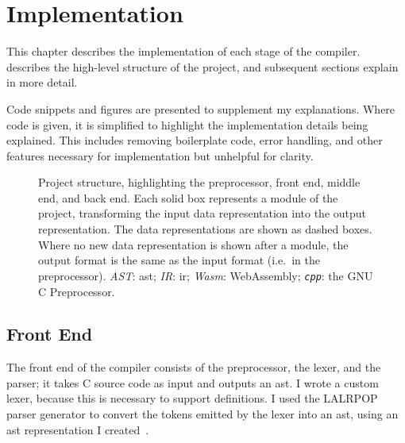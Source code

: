 \documentclass[00-main.tex]{subfiles}
\begin{document}
\chapter{Implementation}

This chapter describes the implementation of each stage of the compiler.
 describes the high-level structure of the project, and subsequent sections explain in more detail.

Code snippets and figures are presented to supplement my explanations.
Where code is given, it is simplified to highlight the implementation details being explained.
This includes removing boilerplate code, error handling, and other features necessary for implementation but unhelpful for clarity.

\begin{figure}[!t]
  \centering
  \caption{Project structure, highlighting the preprocessor, front end, middle end, and back end. Each solid box represents a module of the project, transforming the input data representation into the output representation. The data representations are shown as dashed boxes. Where no new data representation is shown after a module, the output format is the same as the input format (i.e.~in the preprocessor). \emph{AST}: \acrlong{ast}; \emph{IR}: \acrlong{ir}; \emph{Wasm}: WebAssembly; \textit{\texttt{cpp}}: the GNU C Preprocessor.}%
  \label{fig:project flowchart}
\end{figure}



\section{Front End}\label{sec:impl:front end}


The front end of the compiler consists of the preprocessor, the lexer, and the parser; it takes C source code as input and outputs an \gls{ast}.
I wrote a custom lexer, because this is necessary to support  definitions.
I used the LALRPOP parser generator to convert the tokens emitted by the lexer into an \gls{ast}, using an \gls{ast} representation I created~.
\end{document}
